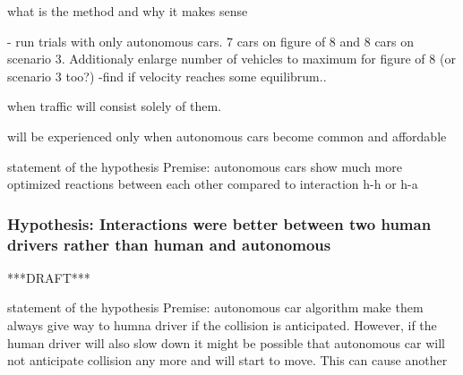 \documentclass[11pt,english]{article}
\begin{document}
\begin{figure}[!] %
\caption{}
\label{fig:equilibrum}
\end{figure} 






what is the method and why it makes sense

- run trials with only autonomous cars. 7 cars on figure of 8 and 8 cars on scenario 3.
Additionaly enlarge number of vehicles to maximum for figure of 8 (or scenario 3 too?)
-find if velocity reaches some equilibrum..




when traffic will consist solely of them.

will be experienced only when autonomous cars
become common and affordable


statement of the hypothesis
Premise: autonomous cars show much more optimized reactions between each other compared to interaction h-h or h-a





\subsubsection{Hypothesis: Interactions were better between two human drivers rather than human and autonomous}

***DRAFT***

statement of the hypothesis
Premise: autonomous car algorithm make them always give way to humna driver if the collision is anticipated. However, if the human driver will also slow down it might be possible that autonomous car will not anticipate collision any more and will start to move. This can cause another   
\end{document}
